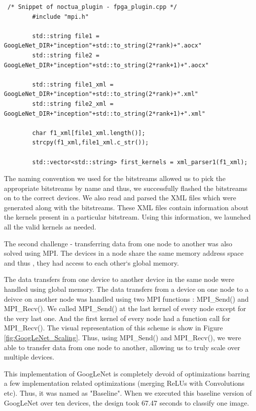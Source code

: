 \begin{code}[!htb]
 \begin{verbatim}
 /* Snippet of noctua_plugin - fpga_plugin.cpp */
        #include "mpi.h"  
        
        std::string file1 = GoogLeNet_DIR+"inception"+std::to_string(2*rank)+".aocx" 
        std::string file2 = GoogLeNet_DIR+"inception"+std::to_string(2*rank+1)+".aocx"  
        
        std::string file1_xml = GoogLeNet_DIR+"inception"+std::to_string(2*rank)+".xml"
        std::string file2_xml = GoogLeNet_DIR+"inception"+std::to_string(2*rank+1)+".xml"   
        
        char f1_xml[file1_xml.length()];
        strcpy(f1_xml,file1_xml.c_str());  
        
        std::vector<std::string> first_kernels = xml_parser1(f1_xml);

\end{verbatim}
\label{code:MPICode_fpga_plugin}
\end{code}

The naming convention we used for the bitstreams allowed us to pick the appropriate bitstreams by  name and thus, we successfully flashed the bitstreams on to the correct devices. We also read and parsed the XML files which were generated along with the bitstreams. These XML files contain information about the kernels present in a particular bitstream. Using this information, we launched all the valid kernels as needed. 

The second challenge - transferring data from one node to another was also solved using MPI. The devices in a node share the same memory address space and thus , they had access to each other`s global memory.   

The data transfers from one device to another device in the same node were handled using global memory. The data transfers from a device on one node to a deivce on another node was handled using two MPI functions : MPI\_Send() and MPI\_Recv(). We called MPI\_Send() at the last kernel of every node except for the very last one. And the first kernel of every node had a function call for MPI\_Recv(). The visual representation of this scheme is show in Figure \ref{fig:GoogLeNet_Scaling}. Thus, using  MPI\_Send() and MPI\_Recv(), we were able to transfer data from one node to another, allowing us to truly scale over multiple devices.

This implementation of GoogLeNet is completely devoid of optimizations barring a few implementation related optimizations (merging ReLUs with Convolutions etc). Thus, it was named as "Baseline". When we executed this baseline version of GoogLeNet over ten devices, the design took 67.47 seconds to classify one image.  

